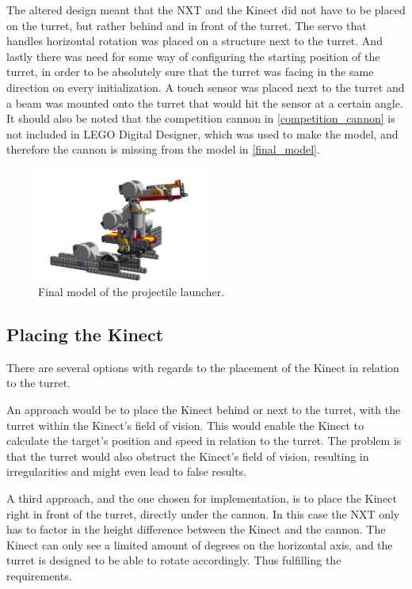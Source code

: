 The altered design meant that the NXT and the Kinect did not have to be placed on the turret, but rather behind and in front of the turret. The servo that handles horizontal rotation was placed on a structure next to the turret. And lastly there was need for some way of configuring the starting position of the turret, in order to be absolutely sure that the turret was facing in the same direction on every initialization. A touch sensor was placed next to the turret and a beam was mounted onto the turret that would hit the sensor at a certain angle. It should also be noted that the competition cannon in \autoref{competition_cannon} is not included in LEGO Digital Designer, which was used to make the model, and therefore the cannon is missing from the model in \autoref{final_model}.

\begin{figure}[hptb]
  \centering
    \includegraphics[width=0.5\textwidth]{img/design_turret4.png}
  \caption{Final model of the projectile launcher.}
  \label{final_model}
\end{figure}

\subsection{Placing the Kinect} %
\label{sub:placing_the_kinect}
There are several options with regards to the placement of the Kinect in relation to the turret. 

An approach would be to place the Kinect behind or next to the turret, with the turret within the Kinect's field of vision. This would enable the Kinect to calculate the target's position and speed in relation to the turret. The problem is that the turret would also obstruct the Kinect's field of vision, resulting in irregularities and might even lead to false results.

A third approach, and the one chosen for implementation, is to place the Kinect right in front of the turret, directly under the cannon. In this case the NXT only has to factor in the height difference between the Kinect and the cannon. The Kinect can only see a limited amount of degrees on the horizontal axis, and the turret is designed to be able to rotate accordingly. Thus fulfilling the requirements.

